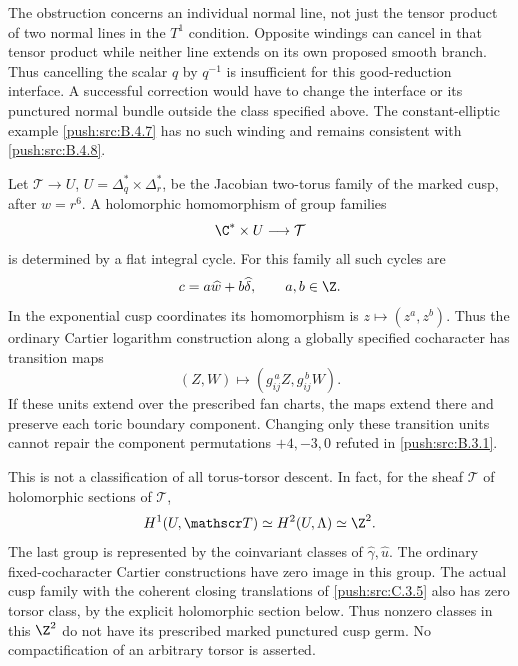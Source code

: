 \begin{remark}
The obstruction concerns an individual normal line,
not just the tensor product of two normal lines in
the $T^1$ condition.  Opposite windings can cancel in
that tensor product while neither line extends on its
own proposed smooth branch.  Thus cancelling the
scalar $q$ by $q^{-1}$ is insufficient for this
good-reduction interface.  A successful correction
would have to change the interface or its punctured
normal bundle outside the class specified above.
The constant-elliptic example \ref{push:src:B.4.7} has no such
winding and remains consistent with \ref{push:src:B.4.8}.
\end{remark}


\begin{proposition}\label{push:src:B.4.9}
Let $\mathcal T\to U$, $U=\Delta_q^*\times\Delta_r^*$,
be the Jacobian two-torus family of the marked cusp,
after $w=r^6$.  A holomorphic homomorphism of group
families
\[
 \C^*\times U\longrightarrow\mathcal T
\]
is determined by a flat integral cycle.  For this family
all such cycles are
\[
 c=a\widehat w+b\widehat\delta,\qquad a,b\in\Z.
\]
In the exponential cusp coordinates its homomorphism
is $z\mapsto(z^a,z^b)$.  Thus the ordinary Cartier
logarithm construction along a globally specified
cocharacter has transition maps
\[
 (Z,W)\longmapsto(g_{ij}^{\,a}Z,g_{ij}^{\,b}W).
\]
If these units extend over the prescribed fan charts,
the maps extend there and preserve each toric
boundary component.  Changing only these transition
units cannot repair the component permutations
$+4,-3,0$ refuted in \ref{push:src:B.3.1}.

This is not a classification of all torus-torsor
descent.  In fact, for the sheaf $\mathscr T$ of
holomorphic sections of $\mathcal T$,
\[
 H^1(U,\mathscr T)\simeq H^2(U,\Lambda)\simeq\Z^2.
\]
The last group is represented by the coinvariant
classes of $\widehat\gamma,\widehat u$.  The ordinary
fixed-cocharacter Cartier constructions have zero
image in this group.  The actual cusp family with
the coherent closing translations of \ref{push:src:C.3.5} also
has zero torsor class, by the explicit holomorphic
section below.  Thus nonzero classes in this
$\Z^2$ do not have its prescribed marked punctured
cusp germ.  No compactification of an arbitrary
torsor is asserted.
\end{proposition}

